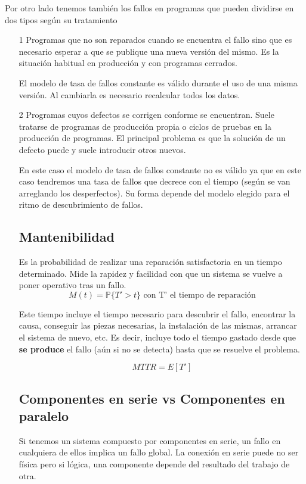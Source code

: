 \documentclass{apuntes}[nochap]
\newcounter{problem}
\begin{document}
Por otro lado tenemos también los fallos en programas que pueden dividirse en dos tipos según su tratamiento
\begin{enumerate}
\item[1] Programas que no son reparados cuando se encuentra el fallo sino que es necesario esperar a que se publique una nueva versión del mismo. Es la situación habitual en producción y con programas cerrados.

El modelo de tasa de fallos constante es válido durante el uso de una misma versión. Al cambiarla es necesario recalcular todos los datos.

\item[2] Programas cuyos defectos se corrigen conforme se encuentran. Suele tratarse de programas de producción propia o ciclos de pruebas en la producción de programas. El principal problema es que la solución de un defecto puede y suele introducir otros nuevos.

En este caso el modelo de tasa de fallos constante no es válido ya que en este caso tendremos una tasa de fallos que decrece con el tiempo (según se van arreglando los desperfectos). Su forma depende del modelo elegido para el ritmo de descubrimiento de fallos.

\subsection{Mantenibilidad}
Es la probabilidad de realizar una reparación satisfactoria en un tiempo determinado. Mide la rapidez y facilidad con que un sistema se vuelve a poner operativo tras un fallo.
\[M(t)=\mathbb{P}\{T'> t\} \text{ con T' el tiempo de reparación}\]

Este tiempo incluye el tiempo necesario para descubrir el fallo, encontrar la causa, conseguir las piezas necesarias, la instalación de las mismas, arrancar el sistema de nuevo, etc. Es decir, incluye todo el tiempo gastado desde que \textbf{se produce} el fallo (aún si no se detecta) hasta que se resuelve el problema.

\[MTTR=E[T']\]

\subsection{Componentes en serie vs Componentes en paralelo}

Si tenemos un sistema compuesto por componentes en serie, un fallo en cualquiera de ellos implica un fallo global. La conexión en serie puede no ser física pero si lógica, una componente depende del resultado del trabajo de otra.


\end{enumerate}
\end{document}
